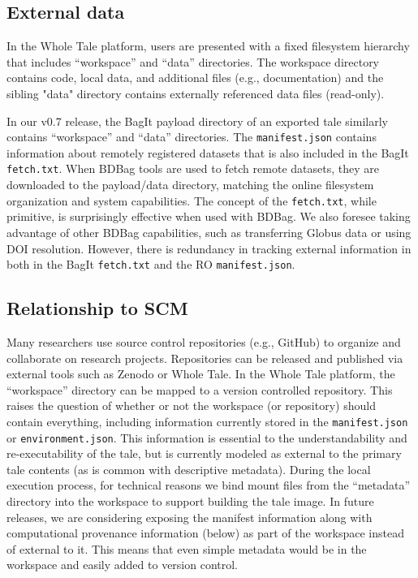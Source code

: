 \documentclass[conference]{IEEEtran}
\begin{document}
\subsection{External data}
In the Whole Tale platform, users are presented with a fixed filesystem hierarchy that includes  ``workspace'' and ``data'' directories. The workspace directory contains code, local data, and additional files (e.g., documentation) and the sibling "data" directory contains externally referenced data files (read-only).

In our v0.7 release, the BagIt payload directory of an exported tale similarly contains ``workspace'' and ``data'' directories. The \texttt{manifest.json} contains information about remotely registered datasets that is also included in the BagIt \texttt{fetch.txt}. When BDBag tools are used to fetch remote datasets, they are downloaded to the payload/data directory, matching the online filesystem organization and system capabilities. The concept of the \texttt{fetch.txt}, while primitive, is surprisingly effective when used with BDBag. We also foresee taking advantage of other BDBag capabilities, such as transferring Globus data or using DOI resolution. However, there is redundancy in tracking external information in both in the BagIt \texttt{fetch.txt} and the RO \texttt{manifest.json}. 

\subsection{Relationship to SCM}
Many researchers use source control repositories (e.g., GitHub) to organize and collaborate on research projects. Repositories can be released and published via external tools such as Zenodo or Whole Tale. In the Whole Tale platform, the ``workspace'' directory can be mapped to a version controlled repository. This raises the question of whether or not the workspace (or repository) should contain everything, including information currently stored in the \texttt{manifest.json} or \texttt{environment.json}. This information is essential to the understandability and re-executability of the tale, but is currently modeled as external to the primary tale contents (as is common with descriptive metadata). During the local execution process, for technical reasons we bind mount files from the ``metadata'' directory into the workspace to support building the tale 
image. In future releases, we are considering exposing the manifest information along with computational provenance information (below) as part of the workspace instead of external to it. This means that even simple metadata would be in the workspace and easily added to version control.
\end{document}
